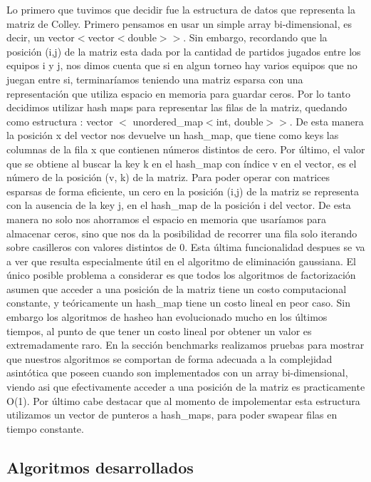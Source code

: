 Lo primero que tuvimos que decidir fue la estructura de datos que representa la matriz de Colley. Primero pensamos en usar un simple array bi-dimensional, es decir, un vector$<$vector$<$double$> >$. Sin embargo, recordando que la posición (i,j) de la matriz esta dada por la cantidad de partidos jugados entre los equipos i y j, nos dimos cuenta que si en algun torneo hay varios equipos que no juegan entre si, terminaríamos  teniendo una matriz esparsa con una representación que utiliza espacio en memoria para guardar ceros. Por lo tanto decidimos utilizar hash maps para representar las filas de la matriz, quedando como estructura :  vector $<$ unordered_map$<$int, double$> >$. De esta manera la posición x del vector nos devuelve un hash_map, que tiene como keys las columnas de la fila x que contienen números distintos de cero. Por último, el valor que se obtiene al buscar la key k en el hash_map con índice v en el vector, es el número de la posición (v, k) de la matriz. Para poder operar con matrices esparsas de forma eficiente, un cero en la posición (i,j) de la matriz se representa con la ausencia de la key j, en el hash_map de la posición i del vector. De esta manera no solo nos ahorramos el espacio en memoria que usaríamos para almacenar ceros, sino que nos da la posibilidad de recorrer una fila solo iterando sobre casilleros con valores distintos de 0. Esta última funcionalidad despues se va a ver que resulta especialmente útil en el algoritmo de eliminación gaussiana. El único posible problema a considerar es que todos los algoritmos de factorización asumen que acceder a una posición de la matriz tiene un costo computacional constante, y teóricamente un hash_map tiene un costo lineal en peor caso. Sin embargo los algoritmos de hasheo han evolucionado mucho en los últimos tiempos, al punto de que tener un costo lineal por obtener un valor es extremadamente raro. En la sección benchmarks realizamos pruebas para mostrar que nuestros algoritmos se comportan de forma adecuada a la complejidad asintótica que poseen cuando son implementados con un array bi-dimensional, viendo asi que efectivamente acceder a una posición de la matriz es practicamente O(1). Por último cabe destacar que al momento de impolementar esta estructura utilizamos un vector de punteros a hash_maps, para poder swapear filas en tiempo constante.

\subsection{Algoritmos desarrollados}

